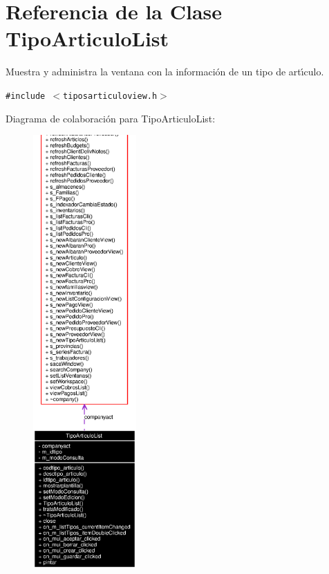 \section{Referencia de la Clase Tipo\-Articulo\-List}
\label{classTipoArticuloList}
Muestra y administra la ventana con la informaci\'{o}n de un tipo de art\'{\i}culo.  


{\tt \#include $<$tiposarticuloview.h$>$}

Diagrama de colaboraci\'{o}n para Tipo\-Articulo\-List:\begin{figure}[H]
\begin{center}
\leavevmode
\includegraphics[width=112pt]{classTipoArticuloList__coll__graph}
\end{center}
\end{figure}
